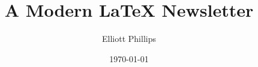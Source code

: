 \documentclass[]{fore}
\title[\TeX{} Newsletter]{A Modern \LaTeX{} Newsletter}
\author{Elliott Phillips}
\institute{Office for National Statistics}
\date{\today}
\begin{document}
	
%

\loadpages
\end{document}
